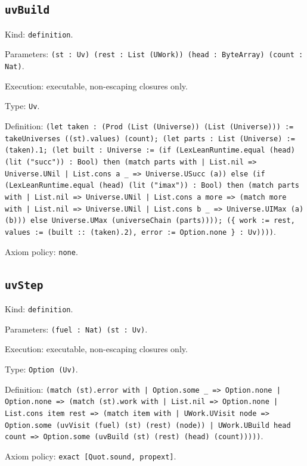 \documentclass[11pt]{article}
\begin{document}
\subsection*{\texttt{uvBuild}}
\noindent Kind: \texttt{definition}.\par
\noindent Parameters: \texttt{(st : Uv) (rest : List (UWork)) (head : ByteArray) (count : Nat)}.\par
\noindent Execution: executable, non-escaping closures only.\par
\noindent Type: \texttt{Uv}.\par
\noindent Definition: \texttt{(let taken : (Prod (List (Universe)) (List (Universe))) := takeUniverses ((st).values) (count); (let parts : List (Universe) := (taken).1; (let built : Universe := (if (LexLeanRuntime.equal (head) (lit ("succ")) : Bool) then (match parts with | List.nil => Universe.UNil | List.cons a \_ => Universe.USucc (a)) else (if (LexLeanRuntime.equal (head) (lit ("imax")) : Bool) then (match parts with | List.nil => Universe.UNil | List.cons a more => (match more with | List.nil => Universe.UNil | List.cons b \_ => Universe.UIMax (a) (b))) else Universe.UMax (universeChain (parts)))); (\{ work := rest, values := (built :: (taken).2), error := Option.none \} : Uv))))}.\par
\noindent Axiom policy: \texttt{none}.\par
\subsection*{\texttt{uvStep}}
\noindent Kind: \texttt{definition}.\par
\noindent Parameters: \texttt{(fuel : Nat) (st : Uv)}.\par
\noindent Execution: executable, non-escaping closures only.\par
\noindent Type: \texttt{Option (Uv)}.\par
\noindent Definition: \texttt{(match (st).error with | Option.some \_ => Option.none | Option.none => (match (st).work with | List.nil => Option.none | List.cons item rest => (match item with | UWork.UVisit node => Option.some (uvVisit (fuel) (st) (rest) (node)) | UWork.UBuild head count => Option.some (uvBuild (st) (rest) (head) (count)))))}.\par
\noindent Axiom policy: \texttt{exact [Quot.sound, propext]}.\par
\end{document}

